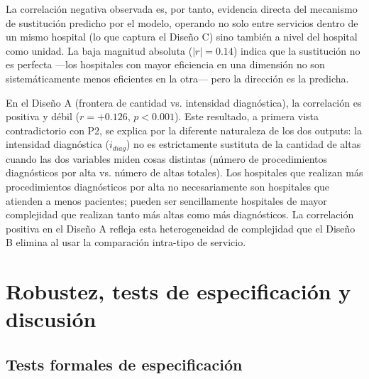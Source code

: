 \documentclass[12pt, a4paper, twoside, openright]{book}
\theoremstyle{plain}
\theoremstyle{definition}
\theoremstyle{remark}
\begin{document}
La correlación negativa observada es, por tanto, evidencia directa del mecanismo de sustitución predicho por el modelo, operando no solo entre servicios dentro de un mismo hospital (lo que captura el Diseño C) sino también a nivel del hospital como unidad. La baja magnitud absoluta ($|r|=0.14$) indica que la sustitución no es perfecta ---los hospitales con mayor eficiencia en una dimensión no son sistemáticamente menos eficientes en la otra--- pero la dirección es la predicha.

En el Diseño A (frontera de cantidad vs. intensidad diagnóstica), la correlación es positiva y débil ($r=+0.126$, $p<0.001$). Este resultado, a primera vista contradictorio con P2, se explica por la diferente naturaleza de los dos outputs: la intensidad diagnóstica ($i_{diag}$) no es estrictamente sustituta de la cantidad de altas cuando las dos variables miden cosas distintas (número de procedimientos diagnósticos por alta vs. número de altas totales). Los hospitales que realizan más procedimientos diagnósticos por alta no necesariamente son hospitales que atienden a menos pacientes; pueden ser sencillamente hospitales de mayor complejidad que realizan tanto más altas como más diagnósticos. La correlación positiva en el Diseño A refleja esta heterogeneidad de complejidad que el Diseño B elimina al usar la comparación intra-tipo de servicio.


\chapter{Robustez, tests de especificación y discusión}
\label{ch:robustez}

\section{Tests formales de especificación}
\end{document}
